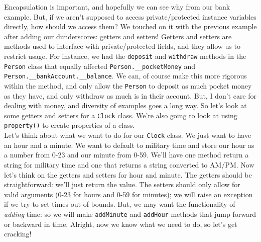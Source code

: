 \documentclass[12pt]{article}
\begin{document}
Encapsulation is important, and hopefully we can see why from our bank example. But, if we aren't supposed to access private/protected instance variables directly, how should we access them? We touched on it with the previous example after adding our dunderscores: getters and setters! Getters and setters are methods used to interface with private/protected fields, and they allow us to restrict usage. For instance, we had the \texttt{deposit} and \texttt{withdraw} methods in the \texttt{Person} class that equally affected \texttt{Person.\_\_pocketMoney} and \texttt{Person.\_\_bankAccount.\_\_balance}. We can, of course make this more rigorous within the method, and only allow the \texttt{Person} to deposit as much pocket money as they have, and only withdraw as much is in their account. But, I don't care for dealing with money, and diversity of examples goes a long way. So let's look at some getters and setters for a \texttt{Clock} class. We're also going to look at using \texttt{property()} to create properties of a class.\\
Let's think about what we want to do for our \texttt{Clock} class. We just want to have an hour and a minute. We want to default to military time and store our hour as a number from 0-23 and our minute from 0-59. We'll have one method return a string for military time and one that returns a string converted to AM/PM. Now let's think on the getters and setters for hour and minute. The getters should be straightforward: we'll just return the value. The setters should only allow for valid arguments (0-23 for hours and 0-59 for minutes); we will raise an exception if we try to set times out of bounds. But, we may want the functionality of \textit{adding} time: so we will make \texttt{addMinute} and \texttt{addHour} methods that jump forward or backward in time. Alright, now we know what we need to do, so let's get cracking!\\
\end{document}
